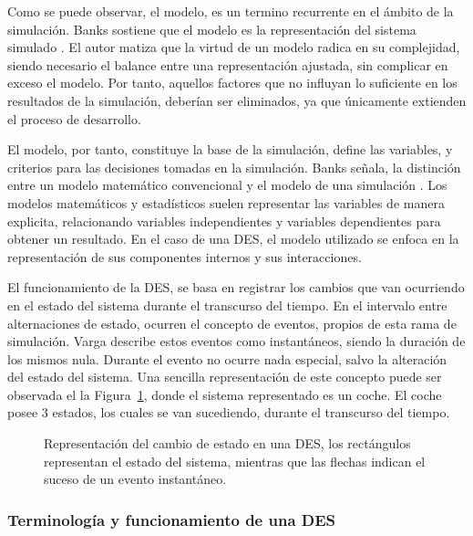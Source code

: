 Como se puede observar, el modelo,
es un termino recurrente en el ámbito de la simulación.
Banks sostiene que el modelo es la representación del sistema simulado
\citep{banks1998handbook}.
El autor matiza que la virtud de un modelo radica en su complejidad,
siendo necesario el balance entre una representación ajustada,
sin complicar en exceso el modelo.
Por tanto, aquellos factores que no influyan lo suficiente
en los resultados de la simulación, deberían ser eliminados,
ya que únicamente extienden el proceso de desarrollo.

El modelo, por tanto, constituye la base de la simulación,
define las variables, y criterios para las decisiones tomadas en la simulación.
Banks señala, la distinción entre un modelo matemático convencional
y el modelo de una simulación \citep{banks1998handbook}.
Los modelos matemáticos y estadísticos
suelen representar las variables de manera explicita,
relacionando variables independientes y variables dependientes
para obtener un resultado.
En el caso de una DES, el modelo utilizado se enfoca en
la representación de sus componentes internos y sus interacciones.

El funcionamiento de la DES, se basa en registrar los cambios
que van ocurriendo en el estado del sistema durante el transcurso del tiempo.
En el intervalo entre alternaciones de estado,
ocurren el concepto de eventos, propios de esta rama de simulación.
Varga \citep{varga2001discrete} describe estos eventos como instantáneos,
siendo la duración de los mismos nula.
Durante el evento no ocurre nada especial,
salvo la alteración del estado del sistema.
Una sencilla representación de este concepto
puede ser observada el la Figura~\ref{fig:2_fc_simple_ex},
donde el sistema representado es un coche.
El coche posee 3 estados, los cuales se van sucediendo,
durante el transcurso del tiempo.

\begin{figure}[h]
	\begin{center}
		
	\end{center}
	\caption{Representación del cambio de estado en una DES,
	los rectángulos representan el estado del sistema,
	mientras que las flechas indican el suceso de un evento instantáneo.}
	\label{fig:2_fc_simple_ex}
\end{figure}

\subsubsection{Terminología y funcionamiento de una DES}\label{TF_DES}

